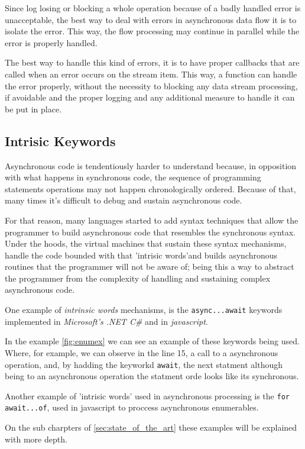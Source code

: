 	Since log losing or blocking a whole operation because of a badly handled error is unacceptable, the best way to deal with errors in asynchronous data flow it is to isolate the error. This way, the flow processing may continue in parallel while the error is properly handled.
	
	The best way to handle this kind of errors, it is to have proper callbacks that are called when an error occurs on the stream item. This way, a function can handle the error properly, without the necessity to blocking any data stream processing, if avoidable and the proper logging and any additional measure to handle it can be put in place.
	\clearpage
	

	\subsection{Intrisic Keywords} 
	
	Asynchronous code is tendentiously harder to understand because, in opposition with what happens in synchronous code, the sequence of programming statements operations may not happen chronologically ordered. 
	Because of that, many times it's difficult to debug and sustain asynchronous code. 

	For that reason, many languages started to add syntax techniques that allow the programmer to build asynchronous code that resembles the synchronous syntax.
	Under the hoods, the virtual machines that sustain these syntax mechanisms, handle the code bounded with that 'intrisic words'and builds asynchronous routines that the programmer will not be aware of;
	being this a way to abstract the programmer from the complexity of handling and sustaining complex asynchronous code. 

	One example of \textit{intrinsic words} mechanisms, is the \texttt{async...await} keywords implemented in \textit{Microsoft's .NET C\#} and in \textit{javascript}. 
	
	In the example \ref{fig:enumex} we can see an example of these keywords being used. 
	Where, for example, we can observe in the line 15, a call to a asynchronous operation, and, by hadding the keyworkd \texttt{await}, the next statment although being to an asynchronous operation the statment orde looks like its synchronous. 
	
	Another example of 'intrisic words' used in asynchronous processing is the \texttt{for await...of}, used in javascript to proccess asynchronous enumerables. 
	

	On the sub charpters of \ref{sec:state_of_the_art} these examples will be explained with more depth.
	\clearpage

